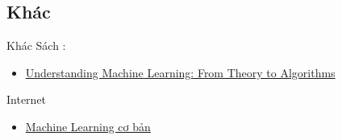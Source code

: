 \documentclass[11pt]{beamer}
\begin{document}
\subsection{Khác}
\begin{frame}{Khác}
Sách :
\begin{itemize}
\item \href{https://pdfs.semanticscholar.org/ce61/5ae61d67db8537e981a0a08da7f0f2ff1cee.pdf?_ga=2.176850727.342533066.1573446520-1563216005.1573446520}{Understanding Machine Learning: From Theory to Algorithms}
\end{itemize}
Internet
\begin{itemize}
\item \href{https://machinelearningcoban.com/}{Machine Learning cơ bản}
\end{itemize}
\end{frame}
\end{document}

